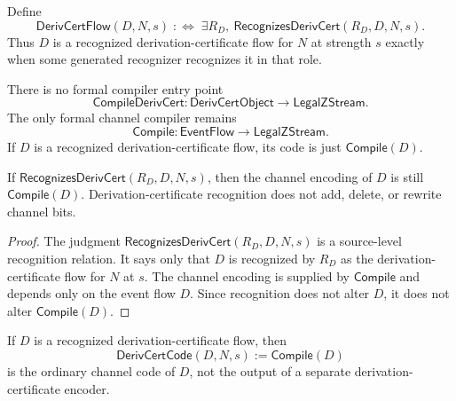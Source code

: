 \begin{definition}
\label{def:derivcert-generated-recognized-derivcert-flow}
Define
$$
  \mathsf{DerivCertFlow}(D,N,s)
  \;:\Longleftrightarrow\;
  \exists R_D,\ \mathsf{RecognizesDerivCert}(R_D,D,N,s).
$$
Thus $D$ is a recognized derivation-certificate flow for $N$ at strength $s$ exactly when some generated recognizer recognizes it in that role.
\end{definition}

\begin{principle}
\label{prin:derivcert-generated-no-external-input}
There is no formal compiler entry point
$$
  \mathsf{CompileDerivCert}
  \colon
  \mathsf{DerivCertObject}
  \longrightarrow
  \mathsf{LegalZStream}.
$$
The only formal channel compiler remains
$$
  \mathsf{Compile}
  \colon
  \mathsf{EventFlow}
  \longrightarrow
  \mathsf{LegalZStream}.
$$
If $D$ is a recognized derivation-certificate flow, its code is just $\mathsf{Compile}(D)$.
\end{principle}

\begin{proposition}
\label{prop:derivcert-generated-recognition-preserves-code}
If $\mathsf{RecognizesDerivCert}(R_D,D,N,s)$, then the channel encoding of $D$ is still $\mathsf{Compile}(D)$. Derivation-certificate recognition does not add, delete, or rewrite channel bits.
\end{proposition}

\begin{proof}
The judgment $\mathsf{RecognizesDerivCert}(R_D,D,N,s)$ is a source-level recognition relation. It says only that $D$ is recognized by $R_D$ as the derivation-certificate flow for $N$ at $s$. The channel encoding is supplied by $\mathsf{Compile}$ and depends only on the event flow $D$. Since recognition does not alter $D$, it does not alter $\mathsf{Compile}(D)$.
\end{proof}

\begin{corollary}
\label{cor:derivcert-generated-code-not-separate}
If $D$ is a recognized derivation-certificate flow, then
$$
  \mathsf{DerivCertCode}(D,N,s) := \mathsf{Compile}(D)
$$
is the ordinary channel code of $D$, not the output of a separate derivation-certificate encoder.
\end{corollary}

